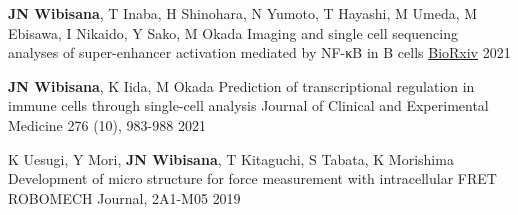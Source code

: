 

\begin{cventries}

  \cvpres
    {\textbf{JN Wibisana}, T Inaba, H Shinohara, N Yumoto, T Hayashi, M Umeda, M Ebisawa, I Nikaido, Y Sako, M Okada} %
    {Imaging and single cell sequencing analyses of super-enhancer activation mediated by NF-κB in B cells} %
    {\href{https://www.biorxiv.org/content/10.1101/2021.07.13.452147v1}{BioRxiv}} %
    {2021} %

  \cvpres
    {\textbf{JN Wibisana}, K Iida, M Okada} %
    {Prediction of transcriptional regulation in immune cells through single-cell analysis} %
    {Journal of Clinical and Experimental Medicine 276 (10), 983-988} %
    {2021} %

\end{cventries}


\begin{cventries}

  \cvpres
    {K Uesugi, Y Mori, \textbf{JN Wibisana}, T Kitaguchi, S Tabata, K Morishima} %
    {Development of micro structure for force measurement with intracellular FRET} %
    {ROBOMECH Journal, 2A1-M05} %
    {2019} %


\end{cventries}
